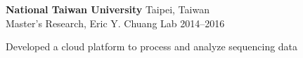\begin{entrylist}
\item \textbf{National Taiwan University} \hfill Taipei, Taiwan\\
Master's Research, Eric Y. Chuang Lab \hfill
2014--2016
\begin{detaillist}
    \item Developed a cloud platform to process and analyze sequencing data
\end{detaillist}

\end{entrylist}
